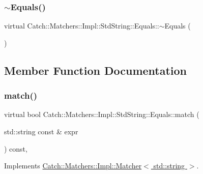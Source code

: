 \subsubsection{\texorpdfstring{$\sim$\+Equals()}{~Equals()}}
{\footnotesize\ttfamily virtual Catch\+::\+Matchers\+::\+Impl\+::\+Std\+String\+::\+Equals\+::$\sim$\+Equals (\begin{DoxyParamCaption}{ }\end{DoxyParamCaption})\hspace{0.3cm}{\ttfamily [virtual]}}



\subsection{Member Function Documentation}
\hypertarget{struct_catch_1_1_matchers_1_1_impl_1_1_std_string_1_1_equals_abf0a94b4e66dbd586268d9983f867e68}{}\label{struct_catch_1_1_matchers_1_1_impl_1_1_std_string_1_1_equals_abf0a94b4e66dbd586268d9983f867e68} 
\subsubsection{\texorpdfstring{match()}{match()}}
{\footnotesize\ttfamily virtual bool Catch\+::\+Matchers\+::\+Impl\+::\+Std\+String\+::\+Equals\+::match (\begin{DoxyParamCaption}\item[{std\+::string const \&}]{expr }\end{DoxyParamCaption}) const\hspace{0.3cm}{\ttfamily [inline]}, {\ttfamily [virtual]}}



Implements \hyperlink{struct_catch_1_1_matchers_1_1_impl_1_1_matcher_a8c1c5511ce1f3738a45e6901b558f583}{Catch\+::\+Matchers\+::\+Impl\+::\+Matcher$<$ std\+::string $>$}.

\hypertarget{struct_catch_1_1_matchers_1_1_impl_1_1_std_string_1_1_equals_ab0d73961b95d9836d77b9e2e94c3790b}{}\label{struct_catch_1_1_matchers_1_1_impl_1_1_std_string_1_1_equals_ab0d73961b95d9836d77b9e2e94c3790b} 
